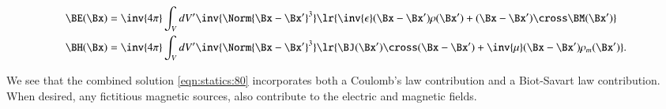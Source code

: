 \begin{dmath}\label{eqn:statics:100}
\begin{aligned}
\BE(\Bx)
&=
\inv{4\pi} \int_V dV' \inv{\Norm{\Bx - \Bx'}^3}
\lr{
   \inv{\epsilon}(\Bx - \Bx') \rho(\Bx')
   +
   (\Bx - \Bx') \cross \BM(\Bx')
} \\
\BH(\Bx)
&=
\inv{4\pi} \int_V dV' \inv{\Norm{\Bx - \Bx'}^3}
\lr{
  \BJ(\Bx') \cross (\Bx - \Bx')
+ \inv{\mu} (\Bx - \Bx') \rho_m(\Bx')
}.
\end{aligned}
\end{dmath}

We see that the combined solution \cref{eqn:statics:80} incorporates both a Coulomb's law contribution and a Biot-Savart law contribution.
When desired, any fictitious magnetic sources, also contribute to the electric and magnetic fields.


